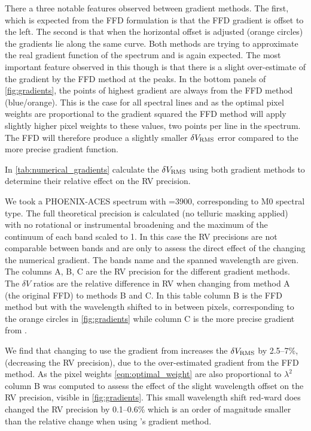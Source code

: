 There a three notable features observed between gradient methods.
The first, which is expected from the {FFD} formulation is that the {FFD} gradient is offset to the left.
The second is that when the horizontal offset is adjusted (orange circles) the gradients lie along the same curve.
Both methods are trying to approximate the real gradient function of the spectrum and is again expected.
The most important feature observed in this though is that there is a slight over-estimate of the gradient by the {FFD} method at the peaks.
In the bottom panels of \cref{fig:gradients}, the points of highest gradient are always from the {FFD} method (blue/orange).
This is the case for all spectral lines and as the optimal pixel weights are proportional to the gradient squared the {FFD} method will apply slightly higher pixel weights to these values, two points per line in the spectrum.
The {FFD} will therefore produce a slightly smaller \(\delta V_{\textrm{RMS}}\) error compared to the more precise gradient function.

In \cref{tab:numerical_gradients}  calculate the  \(\delta V_{\textrm{RMS}}\) using both gradient methods to determine their relative effect on the {RV} precision.

We took a {PHOENIX-ACES} spectrum with \Teff{}=3900\K{}, corresponding to {{M0}} spectral type.
The full theoretical precision is calculated (no telluric masking applied) with no rotational or instrumental broadening and the maximum of the continuum of each band scaled to 1.
In this case the {RV} precisions are not comparable between bands and are only to assess the direct effect of the changing the numerical gradient.
The bands name and the spanned wavelength are given.
The columns A, B, C are the {RV} precision for the different gradient methods.
The \(\delta V\) ratios are the relative difference in {RV} when changing from method A (the original {FFD}) to methods B and C.
In this table column B is the {FFD} method but with the wavelength shifted to in between pixels, corresponding to the orange circles in \cref{fig:gradients} while column C is the more precise gradient from \numpy{}.

We find that changing to use the gradient from \numpy{} increases the \(\delta V_{\textrm{RMS}}\) by 2.5--7\%, (decreasing the {RV} precision), due to the over-estimated gradient from the {FFD} method.
As the pixel weights \cref{eqn:optimal_weight} are also proportional to \({\lambda}^{2}\) column B was computed to assess the effect of the slight wavelength offset on the {RV} precision, visible in \cref{fig:gradients}.
This small wavelength shift red-ward does changed the {RV} precision by 0.1--0.6\% which is an order of magnitude smaller than the relative change when using \numpy{}'s gradient method.


